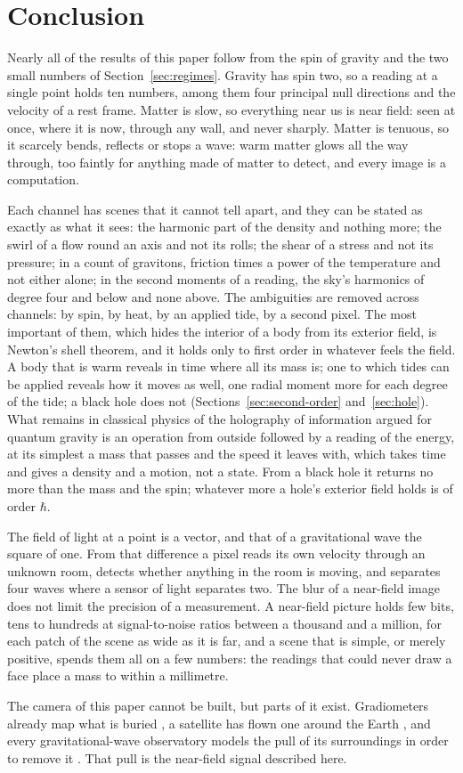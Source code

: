 \section{Conclusion}\label{sec:conclusion}

Nearly all of the results of this paper follow from the spin of gravity and
the two small numbers of Section~\ref{sec:regimes}. Gravity has spin two, so a reading at a single
point holds ten numbers, among them four principal null directions and the
velocity of a rest frame. Matter is slow, so
everything near us is near field: seen at once, where it is now, through any
wall, and never sharply. Matter is tenuous, so it scarcely bends, reflects or stops
a wave: warm matter glows all the way through, too faintly for anything made
of matter to detect, and every image is a computation.

Each channel has scenes that it cannot tell apart, and they can be stated as
exactly as what it sees: the harmonic part of the density and
nothing more; the swirl of a flow round an axis and not its rolls; the shear of a stress and
not its pressure; in a count of gravitons, friction times a power of the temperature and not either
alone; in the second moments of a reading, the sky's harmonics of degree four and below and none above. The ambiguities
are removed across channels: by spin, by heat, by an applied tide, by a second
pixel. The most important of them, which hides the interior of a body from its
exterior field, is Newton's shell theorem, and it holds only to first
order in whatever feels the field. A body that is warm
reveals in time where all its mass is; one to which tides can be applied
reveals how it moves as well, one radial moment more for each degree of the
tide; a black hole does not (Sections~\ref{sec:second-order} and~\ref{sec:hole}). What remains in
classical physics of the holography of information argued for quantum gravity
is an operation from outside followed by a reading of the energy, at its simplest a mass that
passes and the speed it leaves with, which takes
time and gives a density and a motion, not a state. From a black
hole it returns no more than the mass and the spin; whatever more a hole's exterior
field holds is of order $\hbar$.

The field of light at a point is a vector, and that of a gravitational wave
the square of one. From that
difference a pixel reads its own velocity through an unknown room, detects
whether anything in the room is moving, and separates four waves
where a sensor of light separates two. The blur of a near-field image does not
limit the precision of a measurement. A near-field picture holds few bits, tens to hundreds
at signal-to-noise ratios between a thousand and a million, for each patch of the scene as wide as it is far, and a scene that is simple,
or merely positive, spends them all on a few numbers: the readings that could
never draw a face place a mass to within a millimetre.

The camera of this paper cannot be built, but parts of it exist.
Gradiometers already map what is buried \cite{Stray2022}, a satellite has
flown one around the Earth \cite{RummelYiStummer2011}, and every gravitational-wave observatory models the
pull of its surroundings in order to remove it \cite{Harms2019}. That pull is
the near-field signal described here.
